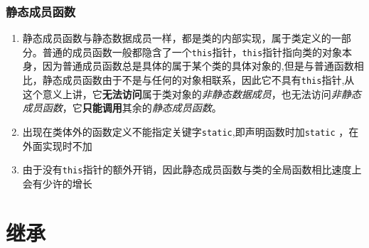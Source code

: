 \documentclass[UTF8,a4paper,12pt]{ctexbook} %
\begin{document}
	\subsection{静态成员函数}
		       \begin{enumerate}[fullwidth,itemindent=2em,label=(\arabic*)]
			       \item  静态成员函数与静态数据成员一样，都是类的内部实现，属于类定义的一部分。普通的成员函数一般都隐含了一个\verb|this|指针，\verb|this|指针指向类的对象本身，因为普通成员函数总是具体的属于某个类的具体对象的,但是与普通函数相比，静态成员函数由于不是与任何的对象相联系，因此它不具有\verb|this|指针,从这个意义上讲，它\textbf{无法访问}属于类对象的\textit{非静态数据成员}，也无法访问\textit{非静态成员函数}，它\textbf{只能调用}其余的\textit{静态成员函数}。
			       
			       \item  出现在类体外的函数定义不能指定关键字\verb|static|,即声明函数时加\verb|static| ，在外面实现时不加
			       
			       \item  由于没有\verb|this|指针的额外开销，因此静态成员函数与类的全局函数相比速度上会有少许的增长
		       \end{enumerate}
	       
\chapter{继承}
\end{document}
